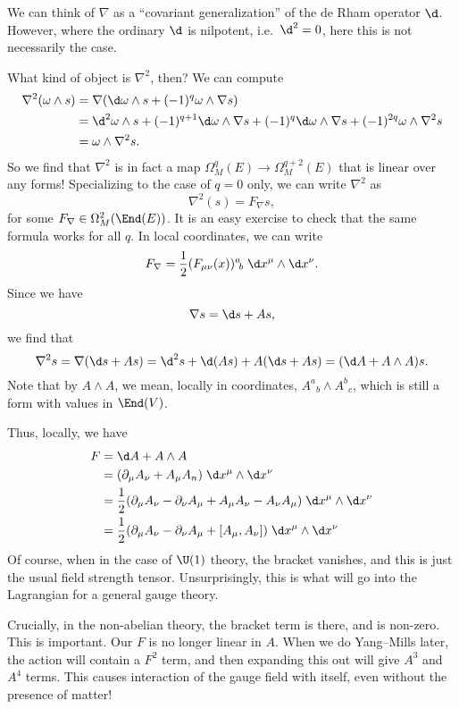 \documentclass[a4paper]{article}
\begin{document}
We can think of $\nabla$ as a ``covariant generalization'' of the de Rham operator $\d$. However, where the ordinary $\d$ is nilpotent, i.e.\ $\d^2 = 0$, here this is not necessarily the case.

What kind of object is $\nabla^2$, then? We can compute
\begin{align*}
  \nabla^2 (\omega \wedge s) &= \nabla(\d \omega \wedge s + (-1)^q \omega \wedge \nabla s)\\
  &= \d^2 \omega \wedge s + (-1)^{q + 1}\d \omega \wedge \nabla s + (-1)^q \d \omega \wedge \nabla s + (-1)^{2q} \omega \wedge \nabla^2 s\\
  &= \omega \wedge \nabla^2 s.
\end{align*}
So we find that $\nabla^2$ is in fact a map $\Omega^q_M(E) \to \Omega^{q + 2}_M(E)$ that is linear over any forms! Specializing to the case of $q = 0$ only, we can write $\nabla^2$ as
\[
  \nabla^2(s) = F_\nabla s,
\]
for some $F_\nabla \in \Omega^2_M(\End(E))$. It is an easy exercise to check that the same formula works for all $q$. In local coordinates, we can write
\[
  F_\nabla = \frac{1}{2} (F_{\mu\nu}(x))^a\!_b\; \d x^\mu \wedge \d x^\nu.
\]
Since we have
\[
  \nabla s = \d s + A s,
\]
we find that
\[
  \nabla^2 s = \nabla(\d s + A s) = \d^2 s + \d (As) + A(\d s + A s) = (\d A + A \wedge A) s.
\]
Note that by $A\wedge A$, we mean, locally in coordinates, $A^a\!_b \wedge A^b\!_c$, which is still a form with values in $\End(V)$.

Thus, locally, we have
\begin{align*}
  F &= \d A + A \wedge A \\
  &= (\partial_\mu A_\nu + A_\mu A_n)\; \d x^\mu \wedge \d x^\nu\\
  &= \frac{1}{2} (\partial_\mu A_\nu - \partial_\nu A_\mu + A_\mu A_\nu - A_\nu A_\mu)\;\d x^\mu \wedge \d x^\nu\\
  &= \frac{1}{2} (\partial_\mu A_\nu - \partial_\nu A_\mu + [A_\mu, A_\nu])\; \d x^\mu \wedge \d x^\nu
\end{align*}
Of course, when in the case of $\U(1)$ theory, the bracket vanishes, and this is just the usual field strength tensor. Unsurprisingly, this is what will go into the Lagrangian for a general gauge theory.

Crucially, in the non-abelian theory, the bracket term is there, and is non-zero. This is important. Our $F$ is no longer linear in $A$. When we do Yang--Mills later, the action will contain a $F^2$ term, and then expanding this out will give $A^3$ and $A^4$ terms. This causes interaction of the gauge field with itself, even without the presence of matter!
\end{document}
